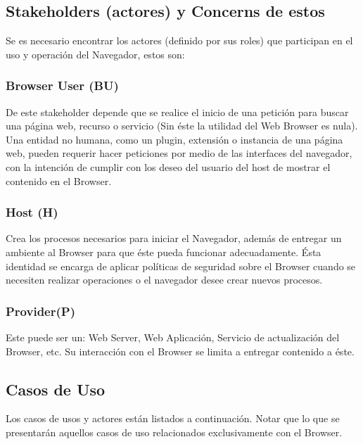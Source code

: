 	\subsection{Stakeholders (actores) y Concerns de estos}
	Se es necesario encontrar los actores (definido por sus roles) que participan en el uso y operación del Navegador, estos son:
		\subsubsection{Browser User (BU)}
		De este stakeholder depende que se realice el inicio de una petición para buscar una página web, recurso o servicio (Sin éste la utilidad del Web Browser es nula). Una entidad no humana, como un plugin, extensión o instancia de una página web, pueden requerir hacer peticiones por medio de las interfaces del navegador, con la intención de cumplir con los deseo del usuario del host de mostrar el contenido en el Browser.
		\subsubsection{Host (H)}
		Crea los procesos necesarios para iniciar el Navegador, además de entregar un ambiente al Browser para que éste pueda funcionar adecuadamente.  Ésta identidad se encarga de aplicar políticas de seguridad sobre el Browser cuando se necesiten realizar operaciones o el navegador desee crear nuevos procesos.
		\subsubsection{Provider(P)}
		Este puede ser un: Web Server, Web Aplicación, Servicio de actualización del Browser, etc. Su interacción con el Browser se limita a entregar contenido a éste.
		\subsection{Casos de Uso}
Los casos de usos y actores están listados a continuación. Notar que lo que se presentarán aquellos casos de uso relacionados exclusivamente con el Browser.

